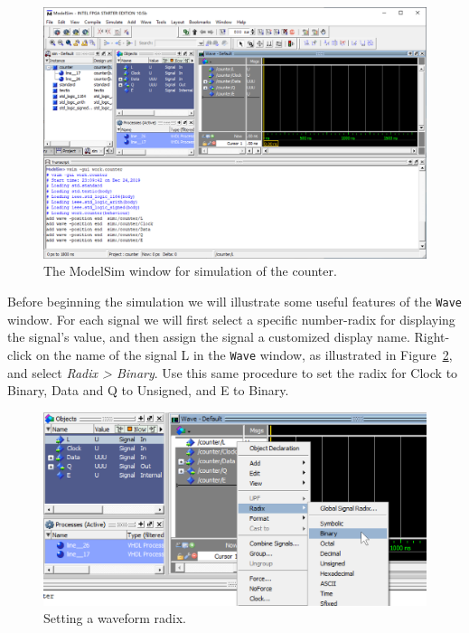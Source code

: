 \documentclass[11pt, twoside, pdftex]{article}
\begin{document}
\begin{figure}[H]
   \begin{center}
      \includegraphics[width=.95\textwidth]{figures/counter_main.png}
   \caption{The ModelSim window for simulation of the counter.} 
	 \label{fig:counter_main}
	 \end{center}
\end{figure}

Before beginning the simulation we will illustrate some useful features of the \texttt{Wave} window.
For each signal we will first select a specific number-radix for displaying the signal's value, and 
then assign the signal a customized display name. Right-click on the name of the 
signal {\sf L} in the \texttt{Wave} 
window, as illustrated in Figure~\ref{fig:counter_radix}, and select {\it Radix > Binary}. Use 
this same procedure to set the radix for {\sf Clock} to {\sf Binary}, {\sf Data} and {\sf Q}
to {\sf Unsigned}, and {\sf E} to {\sf Binary}.

\begin{figure}[H]
   \begin{center}
      \includegraphics[scale=.75]{figures/counter_radix.png}
   \caption{Setting a waveform radix.} 
	 \label{fig:counter_radix}
	 \end{center}
\end{figure}
\end{document}
